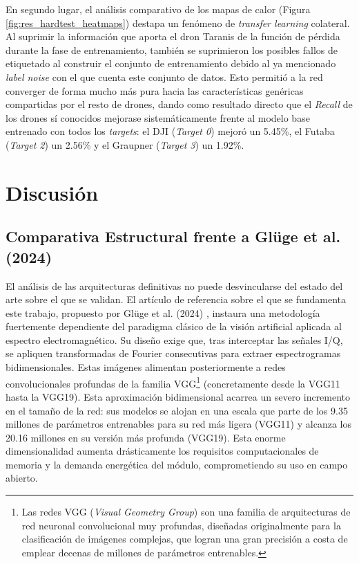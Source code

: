 En segundo lugar, el análisis comparativo de los mapas de calor (Figura \ref{fig:res_hardtest_heatmaps}) destapa un fenómeno de \textit{transfer learning} colateral. Al suprimir la información que aporta el dron Taranis de la función de pérdida durante la fase de entrenamiento, también se suprimieron los posibles fallos de etiquetado al construir el conjunto de entrenamiento debido al ya mencionado \textit{label noise} con el que cuenta este conjunto de datos. Esto permitió a la red converger de forma mucho más pura hacia las características genéricas compartidas por el resto de drones, dando como resultado directo que el \textit{Recall} de los drones sí conocidos mejorase sistemáticamente frente al modelo base entrenado con todos los \textit{targets}: el DJI (\textit{Target 0}) mejoró un 5.45\%, el Futaba (\textit{Target 2}) un 2.56\% y el Graupner (\textit{Target 3}) un 1.92\%. 

\section{Discusión}
\label{sec:discusion}

\subsection{Comparativa Estructural frente a Glüge et al. (2024)}
\label{subsec:disc_gluge}

El análisis de las arquitecturas definitivas no puede desvincularse del estado del arte sobre el que se validan. El artículo de referencia sobre el que se fundamenta este trabajo, propuesto por Glüge et al. (2024) \cite{gluge_robust_2024}, instaura una metodología fuertemente dependiente del paradigma clásico de la visión artificial aplicada al espectro electromagnético. Su diseño exige que, tras interceptar las señales I/Q, se apliquen transformadas de Fourier consecutivas para extraer espectrogramas bidimensionales. Estas imágenes alimentan posteriormente a redes convolucionales profundas de la familia VGG\footnote{Las redes VGG (\textit{Visual Geometry Group}) son una familia de arquitecturas de red neuronal convolucional muy profundas, diseñadas originalmente para la clasificación de imágenes complejas, que logran una gran precisión a costa de emplear decenas de millones de parámetros entrenables.} (concretamente desde la VGG11 hasta la VGG19). Esta aproximación bidimensional acarrea un severo incremento en el tamaño de la red: sus modelos se alojan en una escala que parte de los 9.35 millones de parámetros entrenables para su red más ligera (VGG11) y alcanza los 20.16 millones en su versión más profunda (VGG19). Esta enorme dimensionalidad aumenta drásticamente los requisitos computacionales de memoria y la demanda energética del módulo, comprometiendo su uso en campo abierto.

